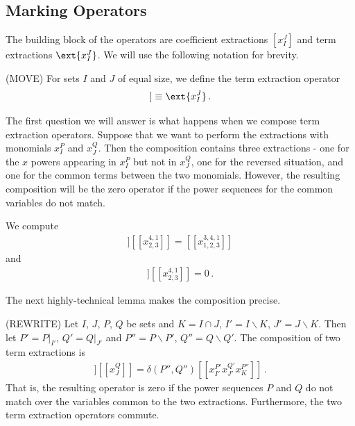 \subsection{Marking Operators}

The building block of the operators are coefficient extractions $[x_I^J]$ and term extractions $\ext{x_I^J}$. We will use the following notation for brevity.
\begin{definition} (MOVE) For sets $I$ and $J$ of equal size, we define the term extraction operator
\begin{align}
	[[x_I^J]] \equiv \ext{x_I^J}\,.
\end{align}
\end{definition}
The first question we will answer is what happens when we compose term extraction operators. Suppose that we want to perform the extractions with monomials $x_I^P$ and $x_J^Q$. Then the composition contains three extractions - one for the $x$ powers appearing in $x_I^P$ but not in $x_J^Q$, one for the reversed situation, and one for the common terms between the two monomials. However, the resulting composition will be the zero operator if the power sequences for the common variables do not match.
\begin{example} We compute
\begin{align}
	[[x_{1,2}^{3,4}]][[x_{2,3}^{4,1}]] = [[x_{1,2,3}^{3,4,1}]]
\end{align}
and
\begin{align}
	[[x_{1,2}^{3,2}]][[x_{2,3}^{4,1}]] = 0\,.
\end{align}
\end{example}
The next highly-technical lemma makes the composition precise.
\begin{lemma} (REWRITE) Let $I,\, J,\, P,\, Q$ be sets and $K = I\cap J$, $I' = I\backslash K$, $J' = J \backslash K$. Then let $P' = P|_{I'}$, $Q' = Q|_{J'}$ and $P'' = P\backslash P'$, $Q'' = Q\backslash Q'$. The composition of two term extractions is
\begin{align}
	[[x_I^P]][[x_J^Q]] = \delta(P'',Q'')[[x_{I'}^{P'}x_{J'}^{Q'}x_K^{P''}]]\,.
\end{align}
That is, the resulting operator is zero if the power sequences $P$ and $Q$ do not match over the variables common to the two extractions. Furthermore, the two term extraction operators commute.
\end{lemma}

